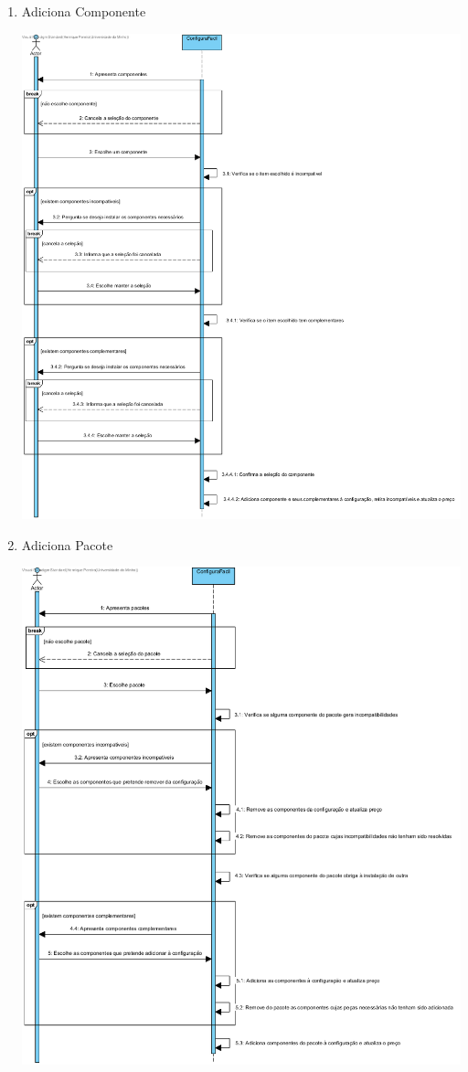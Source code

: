 \documentclass[11pt]{article} %
\begin{document}
\begin{enumerate}
	\item Adiciona Componente
		\begin{center}
 			\includegraphics[width = 6in]{dss_adiciona_componente.png}
		\end{center}
	\item Adiciona Pacote
		\begin{center}
 			\includegraphics[width = 6in]{dss_adiciona_pacote.png}

\end{center}
\end{enumerate}
\end{document}
